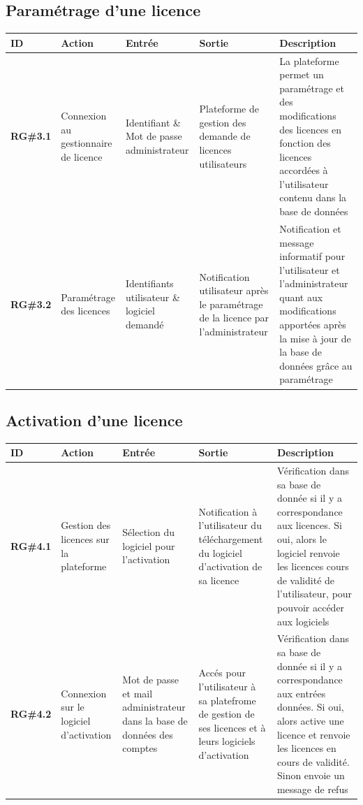 \newpage
\subsection{Paramétrage d'une licence}

\begin{table}[!h] %
    \small
    \begin{tabular}{|m{1.5cm}|m{1.9cm}|m{2.5cm}|m{2.5cm}|m{7cm}|} 
	\hline
	    \textbf{ID} & \textbf{Action} & \textbf{Entrée} & \textbf{Sortie} & \textbf{Description} \\
	\hline
	    \textbf{RG\#3.1} & Connexion au gestionnaire de licence & Identifiant \& Mot de passe administrateur & Plateforme de gestion  des demande de licences utilisateurs & La plateforme permet un paramétrage et des modifications des licences en fonction des licences accordées à l'utilisateur contenu dans la base de données\\
	\hline
	    \textbf{RG\#3.2} & Paramétrage  des licences& Identifiants utilisateur \&  logiciel demandé & Notification utilisateur après le paramétrage de la licence par l'administrateur & Notification et message informatif pour l'utilisateur et l'administrateur quant aux modifications apportées après la mise à jour de la base de données grâce au paramétrage\\
	\hline	    
    \end{tabular}
\end{table}

\subsection{Activation d'une licence}

\begin{table}[!h] %
    \small
    \begin{tabular}{|m{1.5cm}|m{1.9cm}|m{2.5cm}|m{2.5cm}|m{7cm}|} 
	\hline
	    \textbf{ID} & \textbf{Action} & \textbf{Entrée} & \textbf{Sortie} & \textbf{Description} \\
	\hline
	    \textbf{RG\#4.1} & Gestion des licences sur la plateforme & Sélection du logiciel pour l'activation & Notification à l'utilisateur du téléchargement du logiciel d'activation de sa licence & Vérification dans sa base de donnée si il y a correspondance aux licences. Si oui, alors le logiciel renvoie les licences cours de validité de l'utilisateur, pour pouvoir accéder aux logiciels \\ 
	\hline
	    \textbf{RG\#4.2} & Connexion sur  le logiciel  d'activation &  Mot de passe et mail administrateur dans la base de données des comptes & Accés pour l'utilisateur à sa platefrome de gestion de ses licences et à leurs logiciels d'activation & Vérification dans sa base de donnée si il y a correspondance aux entrées données. Si oui, alors active une licence et renvoie les licences en cours de validité. Sinon envoie un message de refus \\ 
	\hline
    \end{tabular}
\end{table}

